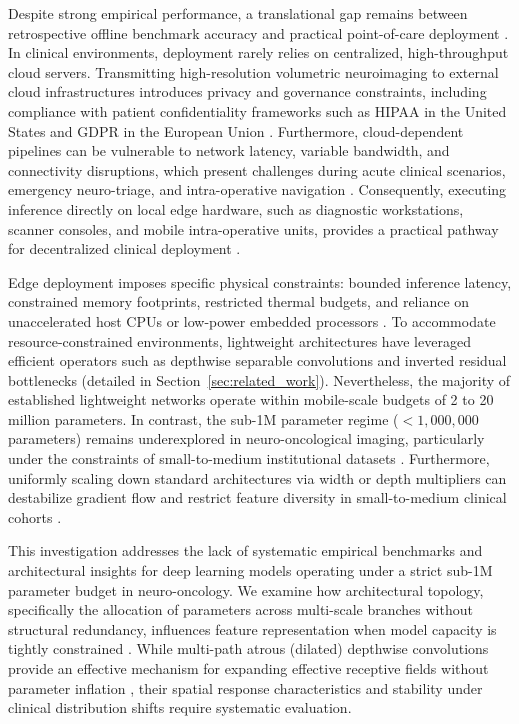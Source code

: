 Despite strong empirical performance, a translational gap remains between retrospective offline benchmark accuracy and practical point-of-care deployment \cite{21, 25}. In clinical environments, deployment rarely relies on centralized, high-throughput cloud servers. Transmitting high-resolution volumetric neuroimaging to external cloud infrastructures introduces privacy and governance constraints, including compliance with patient confidentiality frameworks such as HIPAA in the United States and GDPR in the European Union \cite{21}. Furthermore, cloud-dependent pipelines can be vulnerable to network latency, variable bandwidth, and connectivity disruptions, which present challenges during acute clinical scenarios, emergency neuro-triage, and intra-operative navigation \cite{21, 25}. Consequently, executing inference directly on local edge hardware, such as diagnostic workstations, scanner consoles, and mobile intra-operative units, provides a practical pathway for decentralized clinical deployment \cite{9, 20, 21}.

Edge deployment imposes specific physical constraints: bounded inference latency, constrained memory footprints, restricted thermal budgets, and reliance on unaccelerated host CPUs or low-power embedded processors \cite{9, 25}. To accommodate resource-constrained environments, lightweight architectures have leveraged efficient operators such as depthwise separable convolutions \cite{11, 27} and inverted residual bottlenecks \cite{22} (detailed in Section~\ref{sec:related_work}). Nevertheless, the majority of established lightweight networks operate within mobile-scale budgets of 2 to 20 million parameters. In contrast, the sub-1M parameter regime ($<1,000,000$ parameters) remains underexplored in neuro-oncological imaging, particularly under the constraints of small-to-medium institutional datasets \cite{3, 16}. Furthermore, uniformly scaling down standard architectures via width or depth multipliers can destabilize gradient flow and restrict feature diversity in small-to-medium clinical cohorts \cite{16, 19}.

This investigation addresses the lack of systematic empirical benchmarks and architectural insights for deep learning models operating under a strict sub-1M parameter budget in neuro-oncology. We examine how architectural topology, specifically the allocation of parameters across multi-scale branches without structural redundancy, influences feature representation when model capacity is tightly constrained \cite{16}. While multi-path atrous (dilated) depthwise convolutions provide an effective mechanism for expanding effective receptive fields without parameter inflation \cite{5, 16}, their spatial response characteristics and stability under clinical distribution shifts require systematic evaluation.

